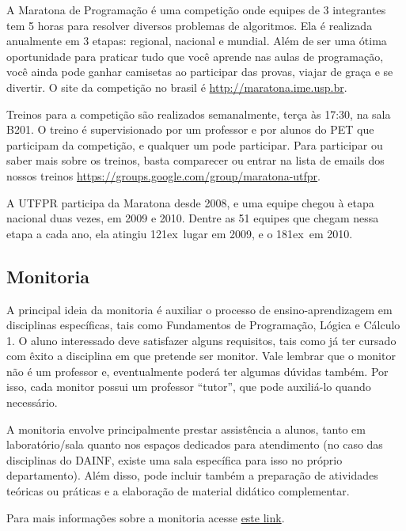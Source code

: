 \documentclass[a4paper,12pt,openany]{article}
\newcommand{\ORD}{\raise1ex\hbox{\underbar{\scriptsize o}}}
\begin{document}
A Maratona de Programação é uma competição onde equipes de 3 integrantes tem 5 horas para resolver diversos problemas de algoritmos. Ela é realizada anualmente em 3 etapas: regional, nacional e mundial. Além de ser uma ótima oportunidade para praticar tudo que você aprende nas aulas de programação, você ainda pode ganhar camisetas ao participar das provas, viajar de graça e se divertir. O site da competição no brasil é \url{http://maratona.ime.usp.br}.

Treinos para a competição são realizados semanalmente, terça às 17:30, na sala B201. O treino é supervisionado por um professor e por alunos do PET que participam da competição, e qualquer um pode participar. Para participar ou saber mais sobre os treinos, basta comparecer ou entrar na lista de emails dos nossos treinos \url{https://groups.google.com/group/maratona-utfpr}. 

A UTFPR participa da Maratona desde 2008, e uma equipe chegou à etapa nacional duas vezes, em 2009 e 2010. Dentre as 51 equipes que chegam nessa etapa a cada ano, ela atingiu 12\ORD \ lugar em 2009, e o 18\ORD \ em 2010.

\subsection{Monitoria}

A principal ideia da monitoria é auxiliar o processo de ensino-aprendizagem em disciplinas específicas, tais como Fundamentos de Programação, Lógica e Cálculo 1. O aluno interessado deve satisfazer alguns requisitos, tais como já ter cursado com êxito a disciplina em que pretende ser monitor. Vale lembrar que o monitor não é um professor e, eventualmente poderá ter algumas dúvidas também. Por isso, cada monitor possui um professor ``tutor'', que pode auxiliá-lo quando necessário.

A monitoria envolve principalmente prestar assistência a alunos, tanto em laboratório/sala quanto nos espaços dedicados para atendimento (no caso das disciplinas do DAINF, existe uma sala específica para isso no próprio departamento). Além disso, pode incluir também a preparação de atividades teóricas ou práticas e a elaboração de material didático complementar.

Para mais informações sobre a monitoria acesse \href{http://www.utfpr.edu.br/estrutura-universitaria/pro-reitorias/prograd/programas-academicos/programa-de-monitoria}{este link}.
\end{document}

